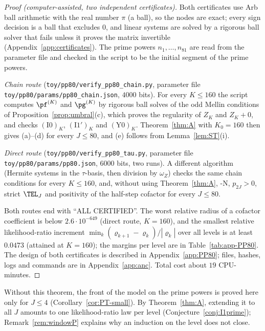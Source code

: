 \begin{proof}[Proof \textup{(computer-assisted, two independent certificates)}]
Both certificates use Arb ball arithmetic \cite{Joh17} with the real number $\pi$ (a ball), so the nodes are
exact; every sign decision is a ball that excludes $0$, and linear systems are solved by a rigorous ball solver that
fails unless it proves the matrix invertible (Appendix~\ref{app:certificates}). The prime powers $n_1,\dots,n_{81}$ are read from
the parameter file and checked in the script to be the initial segment of the prime powers.

\emph{Chain route} (\nolinkurl{toy/pp80/verify_pp80_chain.py}, parameter file
\nolinkurl{toy/pp80/params/pp80_chain.json}, $4000$ bits). For every $K\le160$ the script computes $\pf^{(K)}$ and
$\pg^{(K)}$ by rigorous ball solves of the odd Mellin conditions of Proposition~\ref{prop:umbral}(c), which proves the
regularity of $Z_K$ and $Z_K+0$, and checks $(\mathrm{I0})_K$, $(\mathrm{I1}')_K$ and $(\mathrm{Y0})_K$. Theorem~\ref{thm:A}
with $K_0=160$ then gives (a)--(d) for every $J\le80$, and (e) follows from Lemma~\ref{lem:ST}(i).

\emph{Direct route} (\nolinkurl{toy/pp80/verify_pp80_tau.py}, parameter file \nolinkurl{toy/pp80/params/pp80.json},
$6000$ bits, two runs). A different algorithm (Hermite systems in the $\tau$-basis, then division by $\omega_Z$) checks
the same chain conditions for every $K\le160$, and, without using Theorem~\ref{thm:A}, \hyp{N}, $p_{2J}>0$, strict
$\TEL_J$ and positivity of the half-step cofactor for every $J\le80$.

Both routes end with ``ALL CERTIFIED''. The worst relative radius of a cofactor coefficient is below
$2.6\cdot10^{-649}$ (direct route, $K=160$), and the smallest relative likelihood-ratio increment
$\min_k(\varrho_{k+1}-\varrho_k)/|\varrho_k|$ over all levels is at least $0.0473$ (attained at $K=160$); the margins per
level are in Table~\ref{tab:app-PP80}. The design of both certificates is described in Appendix~\ref{app:PP80};
files, hashes, logs and commands are in Appendix~\ref{app:anc}. Total cost about $19$ CPU-minutes.
\end{proof}

Without this theorem, the front of the model on the prime powers is proved here only for $J\le4$
(Corollary~\ref{cor:PT-small}). By Theorem~\ref{thm:A}, extending it to all $J$ amounts to one likelihood-ratio law per
level (Conjecture~\ref{conj:I1prime}); Remark~\ref{rem:windowP} explains why an induction on the level does not close.

